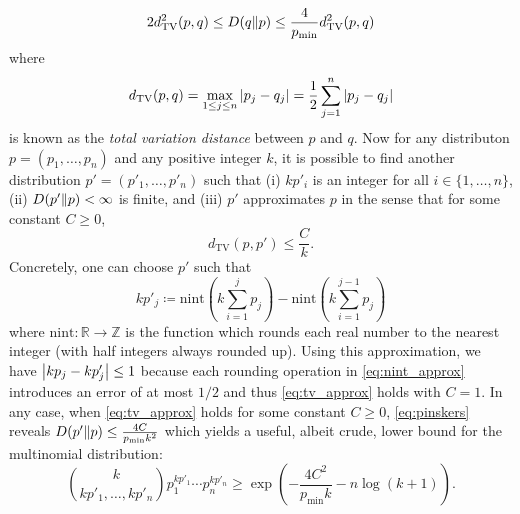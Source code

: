 \documentclass[notitlepage, 10pt]{article}
\begin{document}
\begin{equation}
    2 d_{\mathrm{TV}}^2(p,q) \leq D\!\left(q\middle\|p\right) \leq \frac{4}{p_{\min}}d_{\mathrm{TV}}^2(p,q) 
\end{equation}
where
\begin{equation}
    \label{eq:pinskers}
    d_{\mathrm{TV}}(p,q) = \max_{1\leq j\leq n}\left|p_j - q_j\right| = \frac{1}{2} \sum_{j=1}^{n}\left|p_j - q_j\right|
\end{equation}
is known as the \textit{total variation distance} between $p$ and $q$.
Now for any distributon $p = (p_1, \ldots, p_n)$ and any positive integer $k$, it is possible to find another distribution $p' = (p'_1, \ldots, p'_n)$ such that (i) $kp'_i$ is an integer for all $i \in \{1,\ldots, n\}$, (ii) $D\!\left(p'\middle\|p\right) < \infty$ is finite, and (iii) $p'$ approximates $p$ in the sense that for some constant $C \geq 0$,
\begin{equation}
    \label{eq:tv_approx}
    d_{\mathrm{TV}}(p,p') \leq \frac{C}{k}.
\end{equation}
Concretely, one can choose $p'$ such that
\begin{equation}
    \label{eq:nint_approx}
    kp'_j \coloneqq \mathrm{nint}\left(k \sum_{i=1}^{j} p_j \right) - \mathrm{nint}\left(k \sum_{i=1}^{j-1} p_j \right)
\end{equation}
where $\mathrm{nint} : \mathbb R \to \mathbb Z$ is the function which rounds each real number to the nearest integer (with half integers always rounded up).
Using this approximation, we have $\left|kp_j-kp'_j\right| \leq 1$ because each rounding operation in \cref{eq:nint_approx} introduces an error of at most $1/2$ and thus \cref{eq:tv_approx} holds with $C = 1$.
In any case, when \cref{eq:tv_approx} holds for some constant $C\geq 0$, \cref{eq:pinskers} reveals $D\!\left(p'\middle\|p\right) \leq \frac{4C}{p_{\min}k^2}$ which yields a useful, albeit crude, lower bound for the multinomial distribution:
\begin{equation}
    \binom{k}{kp'_1, \ldots, kp'_n} p_1^{kp'_1} \cdots p_n^{kp'_n} \geq \exp\left(-\frac{4C^2}{p_{\min}k} - n \log (k+1) \right).
\end{equation}
\end{document}

